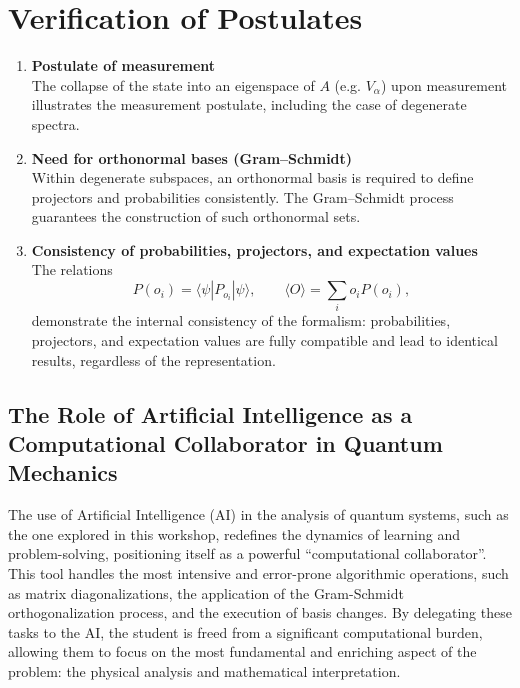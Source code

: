 \documentclass[11pt,a4paper]{article}
\begin{document}
\section{Verification of Postulates}

\begin{enumerate}
  \item \textbf{Postulate of measurement} \\
    The collapse of the state into an eigenspace of $A$ (e.g. $V_\alpha$) upon
    measurement illustrates the measurement postulate, including the case of
    degenerate spectra.

  \item \textbf{Need for orthonormal bases (Gram--Schmidt)} \\
    Within degenerate subspaces, an orthonormal basis is required to define
    projectors and probabilities consistently. The Gram--Schmidt process
    guarantees the construction of such orthonormal sets.

  \item \textbf{Consistency of probabilities, projectors, and expectation values} \\
    The relations
    \[
      P(o_i) = \langle \psi | P_{o_i} | \psi \rangle, \qquad
      \langle O \rangle = \sum_i o_i P(o_i),
    \]
    demonstrate the internal consistency of the formalism: probabilities,
    projectors, and expectation values are fully compatible and lead to
    identical results, regardless of the representation.
\end{enumerate}

\subsection*{The Role of Artificial Intelligence as a Computational Collaborator in Quantum Mechanics}

The use of Artificial Intelligence (AI) in the analysis of quantum systems, such
as the one explored in this workshop, redefines the dynamics of learning and
problem-solving, positioning itself as a powerful ``computational
collaborator''. This tool handles the most intensive and error-prone algorithmic
operations, such as matrix diagonalizations, the application of the Gram-Schmidt
orthogonalization process, and the execution of basis changes. By delegating
these tasks to the AI, the student is freed from a significant computational
burden, allowing them to focus on the most fundamental and enriching aspect of
the problem: the physical analysis and mathematical interpretation.
\end{document}
